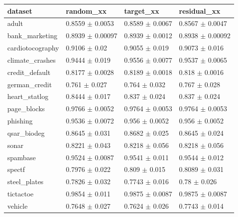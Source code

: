 \begin{tabular}{llll}
\toprule
dataset & random\_xx & target\_xx & residual\_xx \\
\midrule
adult & 0.8559 $\pm$ 0.0053 & 0.8589 $\pm$ 0.0067 & 0.8567 $\pm$ 0.0047 \\
bank\_marketing & 0.8939 $\pm$ 0.00097 & 0.8939 $\pm$ 0.0012 & 0.8938 $\pm$ 0.00092 \\
cardiotocography & 0.9106 $\pm$ 0.02 & 0.9055 $\pm$ 0.019 & 0.9073 $\pm$ 0.016 \\
climate\_crashes & 0.9444 $\pm$ 0.019 & 0.9556 $\pm$ 0.0077 & 0.9537 $\pm$ 0.0065 \\
credit\_default & 0.8177 $\pm$ 0.0028 & 0.8189 $\pm$ 0.0018 & 0.818 $\pm$ 0.0016 \\
german\_credit & 0.761 $\pm$ 0.027 & 0.764 $\pm$ 0.032 & 0.767 $\pm$ 0.028 \\
heart\_statlog & 0.8444 $\pm$ 0.017 & 0.837 $\pm$ 0.024 & 0.837 $\pm$ 0.024 \\
page\_blocks & 0.9766 $\pm$ 0.0052 & 0.9764 $\pm$ 0.0053 & 0.9764 $\pm$ 0.0053 \\
phishing & 0.9536 $\pm$ 0.0072 & 0.956 $\pm$ 0.0052 & 0.956 $\pm$ 0.0052 \\
qsar\_biodeg & 0.8645 $\pm$ 0.031 & 0.8682 $\pm$ 0.025 & 0.8645 $\pm$ 0.024 \\
sonar & 0.8221 $\pm$ 0.043 & 0.8218 $\pm$ 0.056 & 0.8218 $\pm$ 0.056 \\
spambase & 0.9524 $\pm$ 0.0087 & 0.9541 $\pm$ 0.011 & 0.9544 $\pm$ 0.012 \\
spectf & 0.7976 $\pm$ 0.022 & 0.809 $\pm$ 0.015 & 0.8089 $\pm$ 0.031 \\
steel\_plates & 0.7826 $\pm$ 0.032 & 0.7743 $\pm$ 0.016 & 0.78 $\pm$ 0.026 \\
tictactoe & 0.9854 $\pm$ 0.011 & 0.9875 $\pm$ 0.0087 & 0.9875 $\pm$ 0.0087 \\
vehicle & 0.7648 $\pm$ 0.027 & 0.7624 $\pm$ 0.026 & 0.7743 $\pm$ 0.014 \\
\bottomrule
\end{tabular}
